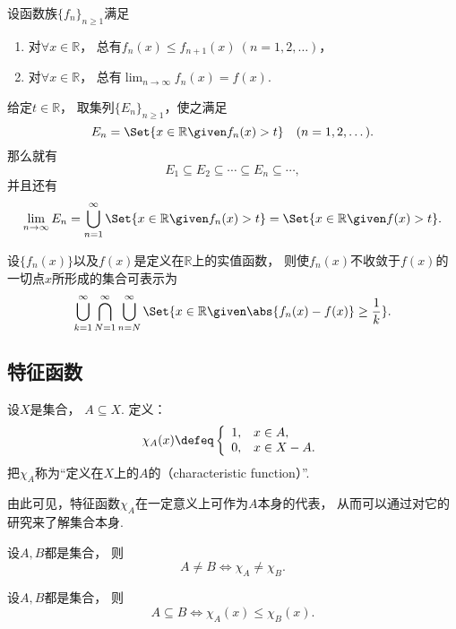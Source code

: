 \begin{example}
设函数族\(\{f_n\}_{n\geq1}\)满足
\begin{enumerate}
	\item 对\(\forall x\in\mathbb{R}\)，
	总有\(f_n(x) \leq f_{n+1}(x)\ (n=1,2,\dotsc)\)，
	\item 对\(\forall x\in\mathbb{R}\)，
	总有\(\lim_{n\to\infty} f_n(x) = f(x)\).
\end{enumerate}
给定\(t\in\mathbb{R}\)，
取集列\(\{E_n\}_{n\geq1}\)，使之满足\[
	E_n = \Set{ x\in\mathbb{R} \given f_n(x) > t }
	\quad(n=1,2,\dotsc).
\]
那么就有\[
	E_1 \subseteq E_2 \subseteq \dotsb \subseteq E_n \subseteq \dotsb,
\]
并且还有\[
	\lim_{n\to\infty} E_n
	= \bigcup_{n=1}^\infty \Set{ x\in\mathbb{R} \given f_n(x) > t }
	= \Set{ x\in\mathbb{R} \given f(x) > t }.
\]
\end{example}

\begin{proposition}
设\(\{f_n(x)\}\)以及\(f(x)\)是定义在\(\mathbb{R}\)上的实值函数，
则使\(f_n(x)\)不收敛于\(f(x)\)的一切点\(x\)所形成的集合可表示为\[
	\bigcup_{k=1}^\infty
	\bigcap_{N=1}^\infty
	\bigcup_{n=N}^\infty
	\Set{
		x\in\mathbb{R}
		\given
		\abs{f_n(x) - f(x)} \geq \frac1k
	}.
\]
\end{proposition}

\subsection{特征函数}
\begin{definition}
设\(X\)是集合，
\(A \subseteq X\).
定义：\[
	\chi_A(x)
	\defeq
	\left\{ \begin{array}{cl}
		1, & x \in A, \\
		0, & x \in X - A.
	\end{array} \right.
\]
把\(\chi_A\)称为“定义在\(X\)上的\(A\)的（characteristic function）”.
\end{definition}
由此可见，特征函数\(\chi_A\)在一定意义上可作为\(A\)本身的代表，
从而可以通过对它的研究来了解集合本身.

\begin{proposition}
设\(A,B\)都是集合，
则\[
	A \neq B \iff \chi_A \neq \chi_B.
\]
\end{proposition}

\begin{proposition}
设\(A,B\)都是集合，
则\[
	A \subseteq B
	\iff
	\chi_A(x) \leq \chi_B(x).
\]
\end{proposition}

